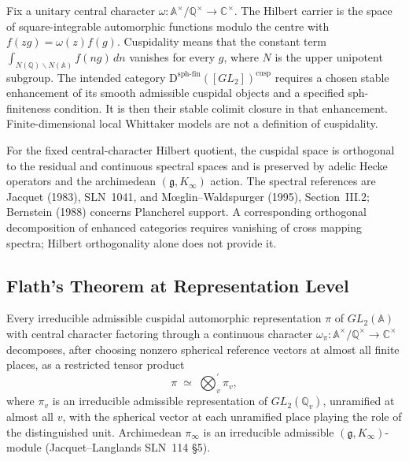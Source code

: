 \begin{definition}
\label{v4-arith:w5-e:def:cuspidal-sph-fin}
Fix a unitary central character
$\omega:\mathbb A^\times/\mathbb Q^\times\to\mathbb C^\times$.
The Hilbert carrier is the space of square-integrable automorphic
functions modulo the centre with $f(zg)=\omega(z)f(g)$.
Cuspidality means that the constant term
$\int_{N(\mathbb Q)\backslash N(\mathbb A)}f(ng)\,dn$ vanishes
for every $g$, where $N$ is the upper unipotent subgroup.
The intended category
$\mathrm D^{\mathrm{sph\text{-}fin}}([GL_2])^{\mathrm{cusp}}$
requires a chosen stable enhancement of its smooth admissible
cuspidal objects and a specified sph-finiteness condition. It is then
their stable colimit closure in that enhancement. Finite-dimensional
local Whittaker models are not a definition of cuspidality.
\end{definition}
\begin{remark}
\label{v4-arith:w5-e:rem:cuspidal-orthogonality}
For the fixed central-character Hilbert quotient, the cuspidal space
is orthogonal to the residual and continuous spectral spaces and is
preserved by adelic Hecke operators and the archimedean
$(\mathfrak g,K_\infty)$ action. The spectral references are Jacquet
(1983), SLN~1041, and M\oe glin--Waldspurger (1995), Section~III.2;
Bernstein (1988) concerns Plancherel support. A corresponding orthogonal
decomposition of enhanced categories requires vanishing of cross
mapping spectra; Hilbert orthogonality alone does not provide it.
\end{remark}

\subsection{Flath's Theorem at Representation Level}

\begin{theorem}
\label{v4-arith:w5-e:thm:Flath}
\ClaimStatusProvedElsewhere Every irreducible admissible
cuspidal automorphic representation \(\pi\) of
\(GL_{2}(\mathbb{A})\) with central character factoring through a
continuous character \(\omega_{\pi}\colon\mathbb{A}^{\times}/\mathbb{Q}^{\times}\to\mathbb{C}^{\times}\)
decomposes, after choosing nonzero spherical reference vectors at almost all finite places, as a restricted tensor product
\[
\pi\;\simeq\;\bigotimes_{v}^{\prime}\pi_{v},
\]
where \(\pi_{v}\) is an irreducible admissible representation of
\(GL_{2}(\mathbb{Q}_{v})\), unramified at almost all \(v\), with the
spherical vector at each unramified place playing the role of the
distinguished unit. Archimedean \(\pi_{\infty}\) is an irreducible
admissible \((\mathfrak{g},K_{\infty})\)-module (Jacquet--Langlands
SLN~114 \S 5).
\end{theorem}

